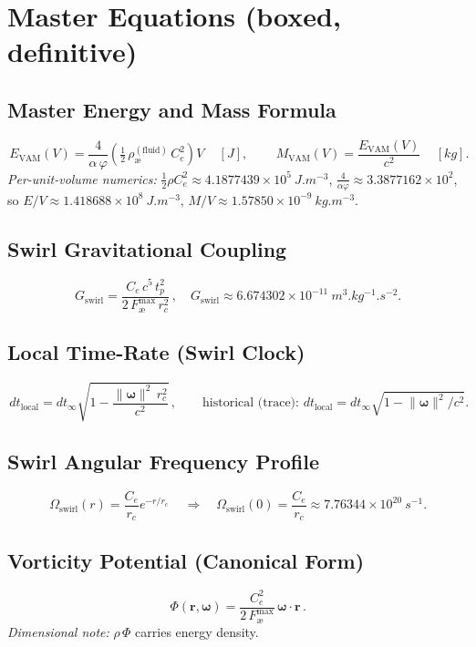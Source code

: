 \documentclass[11pt,a4paper]{article}
\begin{document}
    \section{Master Equations (boxed, definitive)}

    \subsection{Master Energy and Mass Formula}
    \[
        \boxed{\,E_{\text{VAM}}(V) = \frac{4}{\alpha\,\varphi}\left(\tfrac{1}{2}\,\rho_{\text{\ae}}^{(\text{fluid})}\,C_e^{2}\right)V\,}\quad[\si{J}],
        \qquad
        \boxed{\,M_{\text{VAM}}(V) = \frac{E_{\text{VAM}}(V)}{c^{2}}\,}\quad[\si{kg}].
    \]
    \emph{Per-unit-volume numerics:}
    $\tfrac{1}{2}\rho C_e^2 \approx 4.1877439\times10^{5}\ \si{J.m^{-3}}$,
    $\tfrac{4}{\alpha\varphi}\approx 3.3877162\times10^{2}$,
    so $E/V \approx 1.418688\times10^{8}\ \si{J.m^{-3}}$,
    $M/V \approx 1.57850\times10^{-9}\ \si{kg.m^{-3}}$.

    \subsection{Swirl Gravitational Coupling}
    \[
        \boxed{\,G_{\text{swirl}} = \frac{C_e\,c^{5}\,t_p^{2}}{2\,F_{\text{\ae}}^{\max}\,r_c^{2}}\,},\quad
        G_{\text{swirl}} \approx 6.674302\times10^{-11}\ \si{m^3.kg^{-1}.s^{-2}}.
    \]

    \subsection{Local Time-Rate (Swirl Clock)}
    \[
        \boxed{\,dt_{\text{local}} = dt_{\infty}\sqrt{1 - \frac{\lVert\bm{\omega}\rVert^{2}\,r_c^{2}}{c^{2}}}\,},\qquad
        \text{historical (trace): }dt_{\text{local}} = dt_{\infty}\sqrt{1 - \lVert\bm{\omega}\rVert^{2}/c^{2}}.
    \]

    \subsection{Swirl Angular Frequency Profile}
    \[
        \boxed{\,\Omega_{\text{swirl}}(r) = \frac{C_e}{r_c} e^{-r/r_c}\,}\quad\Rightarrow\quad
        \Omega_{\text{swirl}}(0)=\frac{C_e}{r_c}\approx 7.76344\times10^{20}\ \si{s^{-1}}.
    \]

    \subsection{Vorticity Potential (Canonical Form)}
    \[
        \boxed{\,\Phi(\bm r,\bm\omega) = \frac{C_e^{2}}{2\,F_{\text{\ae}}^{\max}}\,\bm\omega\!\cdot\!\bm r\,}.
    \]
    \emph{Dimensional note:} $\rho\,\Phi$ carries energy density.
\end{document}
